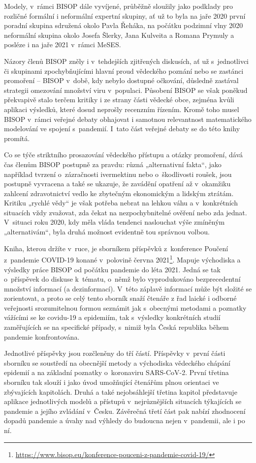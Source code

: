  Modely, v~rámci BISOP dále vyvíjené, průběžně sloužily jako podklady pro rozličné formální i neformální expertní skupiny, ať už to byla na jaře 2020 první poradní skupina sdružená okolo Pavla Řeháka, na počátku podzimní vlny 2020 neformální skupina okolo Josefa Šlerky, Jana Kulveita a Romana Prymuly a posléze i na jaře 2021 v~rámci MeSES.

 Názory členů BISOP zněly i v~tehdejších zjitřených diskusích, ať už s~jednotlivci či skupinami zpochybňujícími hlavní proud vědeckého poznání nebo se zastánci promoření -- BISOP v~době, kdy nebylo dostupné očkování, důsledně zastával strategii omezování množství viru v~populaci. Působení BISOP se však poněkud překvapivě stalo terčem kritiky i ze strany části vědecké obce, zejména kvůli aplikaci výsledků, které dosud neprošly recenzním řízením. Kromě toho musel BISOP v~rámci veřejné debaty obhajovat i samotnou relevantnost matematického modelování ve spojení s~pandemií. I~tato část veřejné debaty se do této knihy promítá.

 Co se týče striktního prosazování vědeckého přístupu a otázky promoření, dává čas členům BISOP postupně za pravdu: různá „alternativní fakta“, jako například tvrzení o~zázračnosti ivermektinu nebo o~škodlivosti roušek, jsou postupně vyvracena a také se ukazuje, že zavádění opatření až v~okamžiku zahlcení zdravotnictví vedlo ke zbytečným ekonomickým a lidským ztrátám. Kritiku „rychlé vědy“ je však potřeba nebrat na lehkou váhu a v~konkrétních situacích vždy zvažovat, zda čekat na nezpochybnitelné ověření nebo zda jednat. V~situaci roku 2020, kdy měla vláda tendenci naslouchat výše zmíněným „alternativám“, byla druhá možnost evidentně tou správnou volbou.


 Kniha, kterou držíte v~ruce, je sborníkem příspěvků z~konference Poučení z~pandemie COVID-19 konané v~polovině června 2021\footnote{\url{https://www.bisop.eu/konference-pouceni-z-pandemie-covid-19/}}. Mapuje východiska a výsledky práce BISOP od počátku pandemie do léta 2021. Jedná se tak o~příspěvek do diskuse k~tématu, o~němž bylo vyprodukováno bezprecedentní množství informací (a dezinformací). V~této záplavě informací může být složité se zorientovat, a proto se celý tento sborník snaží čtenáře z řad laické i odborné veřejnosti srozumitelnou formou seznámit jak s~obecnými metodami a poznatky vážícími se ke covidu-19 a epidemiím, tak s~výsledky konkrétních studií zaměřujících se na specifické případy, s~nimiž byla Česká republika během pandemie konfrontována.


 Jednotlivé příspěvky jsou rozčleněny do tří částí. Příspěvky v~první části sborníku se soustředí na obecnější metody a východiska vědeckého chápání epidemií a na základní poznatky o~koronaviru SARS-CoV-2. První třetina sborníku tak slouží i jako úvod umožňující čtenářům plnou orientaci ve zbývajících kapitolách. Druhá a také nejobsáhlejší třetina kapitol představuje aplikace jednotlivých modelů a přístupů v~nejrůznějších situacích týkajících se pandemie a jejího zvládání v~Česku. Závěrečná třetí část pak nabízí zhodnocení dopadů pandemie a úvahy nad výhledy do budoucna nejen v~pandemii, ale i po ní.

